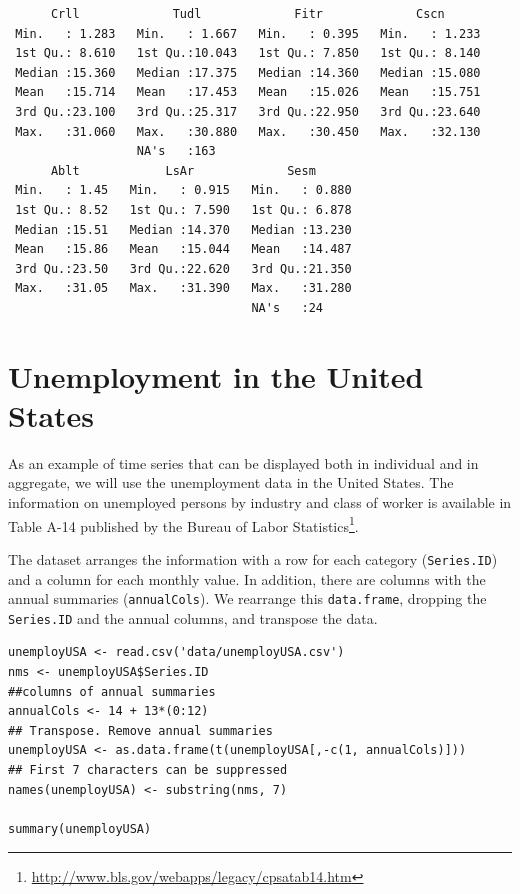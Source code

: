 \documentclass[smallroyalvopaper]{memoir}
\begin{document}
\begin{verbatim}
      Crll             Tudl             Fitr             Cscn       
 Min.   : 1.283   Min.   : 1.667   Min.   : 0.395   Min.   : 1.233  
 1st Qu.: 8.610   1st Qu.:10.043   1st Qu.: 7.850   1st Qu.: 8.140  
 Median :15.360   Median :17.375   Median :14.360   Median :15.080  
 Mean   :15.714   Mean   :17.453   Mean   :15.026   Mean   :15.751  
 3rd Qu.:23.100   3rd Qu.:25.317   3rd Qu.:22.950   3rd Qu.:23.640  
 Max.   :31.060   Max.   :30.880   Max.   :30.450   Max.   :32.130  
                  NA's   :163                                       
      Ablt            LsAr             Sesm       
 Min.   : 1.45   Min.   : 0.915   Min.   : 0.880  
 1st Qu.: 8.52   1st Qu.: 7.590   1st Qu.: 6.878  
 Median :15.51   Median :14.370   Median :13.230  
 Mean   :15.86   Mean   :15.044   Mean   :14.487  
 3rd Qu.:23.50   3rd Qu.:22.620   3rd Qu.:21.350  
 Max.   :31.05   Max.   :31.390   Max.   :31.280  
                                  NA's   :24
\end{verbatim}

\section{Unemployment in the United States}
\label{sec:org56131cd}
As an example of time series that can be displayed both in individual
and in aggregate, we will use the unemployment data in the United
States. The information on unemployed persons by industry and class of
worker is available in Table A-14 published by the Bureau of Labor
Statistics\footnote{\url{http://www.bls.gov/webapps/legacy/cpsatab14.htm}}.

The dataset arranges the information with a row for each category
(\texttt{Series.ID}) and a column for each monthly value. In addition, there
are columns with the annual summaries (\texttt{annualCols}). We rearrange
this \texttt{data.frame}, dropping the \texttt{Series.ID} and the annual columns,
and transpose the data.


\lstset{language=r,label= ,caption= ,captionpos=b,numbers=none}
\begin{lstlisting}
unemployUSA <- read.csv('data/unemployUSA.csv')
nms <- unemployUSA$Series.ID
##columns of annual summaries
annualCols <- 14 + 13*(0:12)
## Transpose. Remove annual summaries
unemployUSA <- as.data.frame(t(unemployUSA[,-c(1, annualCols)]))
## First 7 characters can be suppressed
names(unemployUSA) <- substring(nms, 7)

summary(unemployUSA)
\end{lstlisting}
\end{document}
